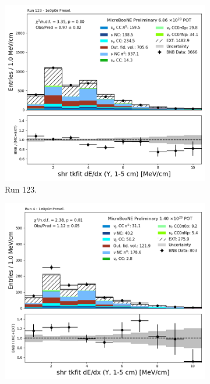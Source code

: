 \begin{figure}[H]
    \centering
    \begin{subfigure}[t]{0.32\linewidth}
        \includegraphics[width=\linewidth]{technote/Appendix_Preselection/Figures/1e0p0pi/Run123/shr_tkfit_gap10_dedx_Y_Run123_1e0p0pi_Presel.png}
        \caption{Run 123.}
    \end{subfigure}%
    \hspace{0.2cm}%
    \begin{subfigure}[t]{0.32\linewidth}
        \includegraphics[width=\linewidth]{technote/Appendix_Preselection/Figures/1e0p0pi/Run4b/shr_tkfit_gap10_dedx_Y_Run4b_1e0p0pi_Presel.png}

\end{subfigure}
\end{figure}
